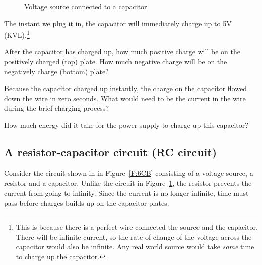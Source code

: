 \begin{figure}[H]
\begin{center}
\caption{Voltage source connected to a capacitor}
\label{F:6CA}
\end{center}
\end{figure}

The instant we plug it in, the capacitor will immediately charge up to 5V (KVL).\footnote{This is because there is a perfect wire connected the source and the capacitor. There will be infinite current, so the rate of change of the voltage across the capacitor would also be infinite. Any real world source would take \emph{some} time to charge up the capacitor.} 

\begin{alevel}
After the capacitor has charged up, how much positive charge will be on the positively charged (top) plate. How much negative charge will be on the negatively charge (bottom) plate?
\end{alevel}

\begin{blevel}
Because the capacitor charged up instantly, the charge on the capacitor flowed down the wire in zero seconds. What would need to be the current in the wire during the brief charging process?
\end{blevel}

\begin{clevel}
How much energy did it take for the power supply to charge up this capacitor?
\end{clevel}

\subsection{A resistor-capacitor circuit (RC circuit)}
Consider the circuit shown in in Figure~\ref{F:6CB} consisting of a voltage source, a resistor and a capacitor. Unlike the circuit in Figure~\ref{F:6CA}, the resistor prevents the current from going to infinity. Since the current is no longer infinite, time must pass before charges builds up on the capacitor plates. 

